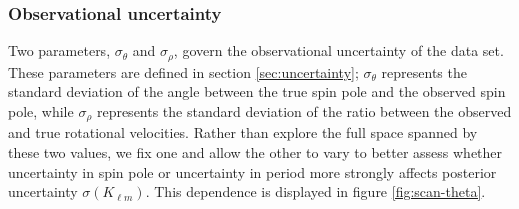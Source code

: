 \documentclass[fleqn,usenatbib]{mnras}
\begin{document}


\subsubsection{Observational uncertainty}
\label{sec:scan-uncertainty}
Two parameters, $\sigma_\theta$ and $\sigma_\rho$, govern the observational uncertainty of the data set. These parameters are defined in section \ref{sec:uncertainty}; $\sigma_\theta$ represents the standard deviation of the angle between the true spin pole and the observed spin pole, while $\sigma_\rho$ represents the standard deviation of the ratio between the observed and true rotational velocities. Rather than explore the full space spanned by these two values, we fix one and allow the other to vary to better assess whether uncertainty in spin pole or uncertainty in period more strongly affects posterior uncertainty $\sigma(K_{\ell m})$. This dependence is displayed in figure \ref{fig:scan-theta}.
\end{document}
